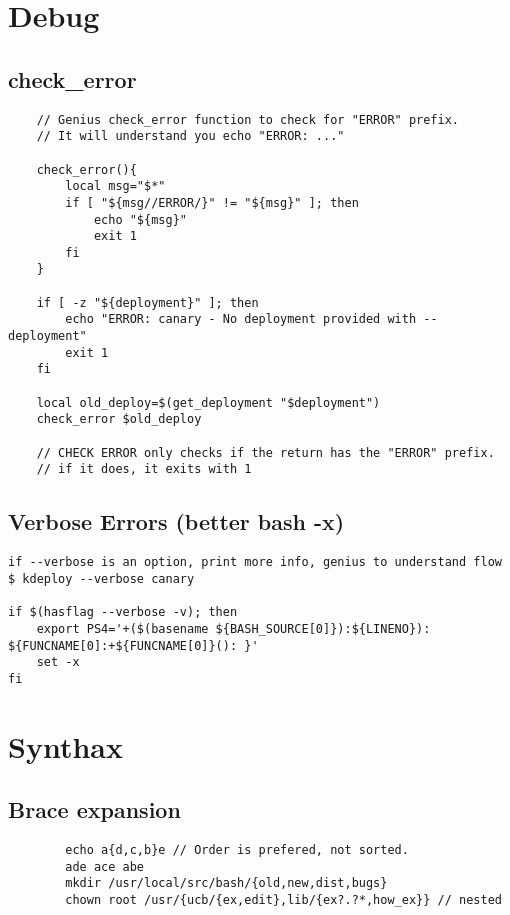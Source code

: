 \section{Debug}

\subsection{check\_error}
\begin{verbatim}
    // Genius check_error function to check for "ERROR" prefix.
    // It will understand you echo "ERROR: ..."

    check_error(){
        local msg="$*"
        if [ "${msg//ERROR/}" != "${msg}" ]; then
            echo "${msg}"
            exit 1
        fi
    }

    if [ -z "${deployment}" ]; then
        echo "ERROR: canary - No deployment provided with --deployment"
        exit 1
    fi

    local old_deploy=$(get_deployment "$deployment")
    check_error $old_deploy

    // CHECK ERROR only checks if the return has the "ERROR" prefix. 
    // if it does, it exits with 1 
\end{verbatim}

\subsection{Verbose Errors (better bash -x)}
    
\begin{verbatim}
if --verbose is an option, print more info, genius to understand flow
$ kdeploy --verbose canary

if $(hasflag --verbose -v); then
    export PS4='+($(basename ${BASH_SOURCE[0]}):${LINENO}): ${FUNCNAME[0]:+${FUNCNAME[0]}(): }'
    set -x
fi
\end{verbatim}

\section{Synthax}
\subsection{Brace expansion}

\begin{verbatim}
        echo a{d,c,b}e // Order is prefered, not sorted.
        ade ace abe
        mkdir /usr/local/src/bash/{old,new,dist,bugs}
        chown root /usr/{ucb/{ex,edit},lib/{ex?.?*,how_ex}} // nested
\end{verbatim}

